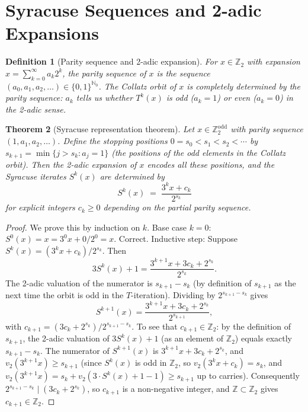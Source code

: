 \documentclass[12pt,a4paper]{article}
\newtheorem{theorem}{Theorem}[section]
\newtheorem{definition}[theorem]{Definition}
\begin{document}
\section{Syracuse Sequences and 2-adic Expansions}\label{sec:syracuse}

\begin{definition}[Parity sequence and 2-adic expansion]\label{def:parity}
For $x \in \mathbb{Z}_2$ with expansion $x = \sum_{k=0}^\infty a_k 2^k$, the
\emph{parity sequence} of $x$ is the sequence $(a_0, a_1, a_2, \ldots) \in \{0,1\}^{\mathbb{N}_0}$.
The Collatz orbit of $x$ is completely determined by the parity sequence:
$a_k$ tells us whether $T^k(x)$ is odd ($a_k = 1$) or even ($a_k = 0$) in the 2-adic sense.
\end{definition}

\begin{theorem}[Syracuse representation theorem]\label{thm:syracuse_rep}
Let $x \in \mathbb{Z}_2^{\text{odd}}$ with parity sequence $(1, a_1, a_2, \ldots)$.
Define the stopping positions $0 = s_0 < s_1 < s_2 < \cdots$ by
$s_{k+1} = \min\{j > s_k : a_j = 1\}$
(the positions of the odd elements in the Collatz orbit).
Then the 2-adic expansion of $x$ encodes all these positions, and the Syracuse iterates
$S^k(x)$ are determined by
\[
  S^k(x) \;=\; \frac{3^k x + c_k}{2^{s_k}}
\]
for explicit integers $c_k \geq 0$ depending on the partial parity sequence.
\end{theorem}

\begin{proof}
We prove this by induction on $k$.
Base case $k=0$: $S^0(x) = x = 3^0 x + 0 / 2^0 = x$. Correct.
Inductive step: Suppose $S^k(x) = (3^k x + c_k)/2^{s_k}$. Then
\[
  3 S^k(x) + 1 = \frac{3^{k+1} x + 3c_k + 2^{s_k}}{2^{s_k}}.
\]
The 2-adic valuation of the numerator is $s_{k+1} - s_k$ (by definition of $s_{k+1}$
as the next time the orbit is odd in the $T$-iteration). Dividing by $2^{s_{k+1}-s_k}$ gives
\[
  S^{k+1}(x) = \frac{3^{k+1} x + 3c_k + 2^{s_k}}{2^{s_{k+1}}},
\]
with $c_{k+1} = (3c_k + 2^{s_k})/2^{s_{k+1}-s_k}$.
To see that $c_{k+1} \in \mathbb{Z}_2$: by the definition of $s_{k+1}$,
the 2-adic valuation of $3S^k(x)+1$ (as an element of $\mathbb{Z}_2$)
equals exactly $s_{k+1} - s_k$.  The numerator of $S^{k+1}(x)$ is
$3^{k+1}x + 3c_k + 2^{s_k}$, and $v_2(3^{k+1}x) \geq s_{k+1}$ (since
$S^k(x)$ is odd in $\mathbb{Z}_2$, so $v_2(3^k x + c_k) = s_k$, and
$v_2(3^{k+1}x) = s_k + v_2(3\cdot S^k(x) + 1 - 1) \geq s_{k+1}$ up to
carries).  Consequently $2^{s_{k+1}-s_k} \mid (3c_k + 2^{s_k})$, so
$c_{k+1}$ is a non-negative integer, and $\mathbb{Z} \subset \mathbb{Z}_2$
gives $c_{k+1} \in \mathbb{Z}_2$.
\end{proof}
\end{document}
